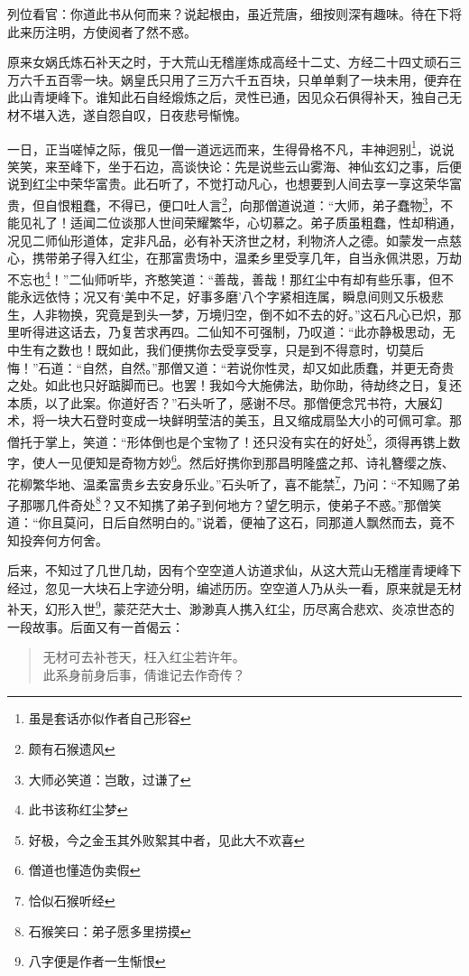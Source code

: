 \documentclass[12pt,oneside]{book}
\newenvironment{shici}{%
\begin{verse}%
\centering\large\hspace{12pt}}%
{\end{verse}}
\begin{document}
列位看官：你道此书从何而来？说起根由，虽近荒唐，细按则深有趣味。待在下将此来历注明，方使阅者了然不惑。

原来女娲氏炼石补天之时，于大荒山无稽崖炼成高经十二丈、方经二十四丈顽石三万六千五百零一块。娲皇氏只用了三万六千五百块，只单单剩了一块未用，便弃在此山青埂峰下。谁知此石自经煅炼之后，灵性已通，因见众石俱得补天，独自己无材不堪入选，遂自怨自叹，日夜悲号惭愧。

一日，正当嗟悼之际，俄见一僧一道远远而来，生得骨格不凡，丰神迥别\footnote{虽是套话亦似作者自己形容}，说说笑笑，来至峰下，坐于石边，高谈快论：先是说些云山雾海、神仙玄幻之事，后便说到红尘中荣华富贵。此石听了，不觉打动凡心，也想要到人间去享一享这荣华富贵，但自恨粗蠢，不得已，便口吐人言\footnote{颇有石猴遗风}，向那僧道说道：“大师，弟子蠢物\footnote{大师必笑道：岂敢，过谦了}，不能见礼了！适闻二位谈那人世间荣耀繁华，心切慕之。弟子质虽粗蠢，性却稍通，况见二师仙形道体，定非凡品，必有补天济世之材，利物济人之德。如蒙发一点慈心，携带弟子得入红尘，在那富贵场中，温柔乡里受享几年，自当永佩洪恩，万劫不忘也\footnote{此书该称红尘梦}！”二仙师听毕，齐憨笑道：“善哉，善哉！那红尘中有却有些乐事，但不能永远依恃；况又有‘美中不足，好事多磨’八个字紧相连属，瞬息间则又乐极悲生，人非物换，究竟是到头一梦，万境归空，倒不如不去的好。”这石凡心已炽，那里听得进这话去，乃复苦求再四。二仙知不可强制，乃叹道：“此亦静极思动，无中生有之数也！既如此，我们便携你去受享受享，只是到不得意时，切莫后悔！”石道：“自然，自然。”那僧又道：“若说你性灵，却又如此质蠢，并更无奇贵之处。如此也只好踮脚而已。也罢！我如今大施佛法，助你助，待劫终之日，复还本质，以了此案。你道好否？”石头听了，感谢不尽。那僧便念咒书符，大展幻术，将一块大石登时变成一块鲜明莹洁的美玉，且又缩成扇坠大小的可佩可拿。那僧托于掌上，笑道：“形体倒也是个宝物了！还只没有实在的好处\footnote{好极，今之金玉其外败絮其中者，见此大不欢喜}，须得再镌上数字，使人一见便知是奇物方妙\footnote{僧道也懂造伪卖假}。然后好携你到那昌明隆盛之邦、诗礼簪缨之族、花柳繁华地、温柔富贵乡去安身乐业。”石头听了，喜不能禁\footnote{恰似石猴听经}，乃问：“不知赐了弟子那哪几件奇处\footnote{石猴笑曰：弟子愿多里捞摸}？又不知携了弟子到何地方？望乞明示，使弟子不惑。”那僧笑道：“你且莫问，日后自然明白的。”说着，便袖了这石，同那道人飘然而去，竟不知投奔何方何舍。

后来，不知过了几世几劫，因有个空空道人访道求仙，从这大荒山无稽崖青埂峰下经过，忽见一大块石上字迹分明，编述历历。空空道人乃从头一看，原来就是无材补天，幻形入世\footnote{八字便是作者一生惭恨}，蒙茫茫大士、渺渺真人携入红尘，历尽离合悲欢、炎凉世态的一段故事。后面又有一首偈云：


\begin{shici}
无材可去补苍天，枉入红尘若许年。\\
此系身前身后事，倩谁记去作奇传？
\end{shici}
\end{document}
